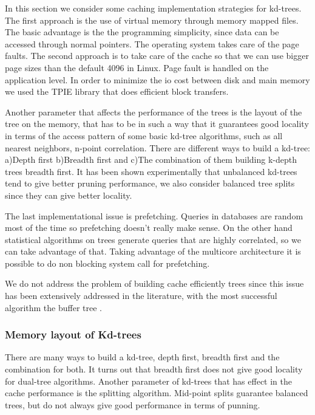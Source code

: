 \documentclass[12pt,letterpaper,doublespaced,ETD,dvips,proposal]{gtthesis}
\begin{document}
\begin{Body}
In this section we consider some caching implementation strategies for
kd-trees. The first approach is the use of virtual memory through
memory mapped files. The basic advantage is the the programming
simplicity, since data can be accessed through normal pointers. The
operating system takes care of the page faults. The second approach
is to take care of the cache so that we can use bigger page sizes
than the default 4096 in Linux. Page fault is handled on the
application level. In order to minimize the io cost between disk and
main memory we used the TPIE library that does efficient block
transfers.

Another parameter that affects the performance of the trees is the
layout of the tree on the memory, that has to be in such a way that
it guarantees good locality in terms of the access pattern of some
basic kd-tree algorithms, such as all  nearest neighbors, n-point
correlation. There are different ways to build a kd-tree: a)Depth
first b)Breadth first and c)The combination of them building k-depth
trees breadth first. It has been shown experimentally that
unbalanced kd-trees tend to give better pruning performance, we also
consider balanced tree splits since they can give better locality.

The last implementational issue is prefetching.  Queries in
databases are random most of the time so prefetching doesn't really
make sense. On the other hand statistical algorithms on trees
generate queries that are highly correlated, so we can take
advantage of that. Taking advantage of the multicore architecture it
is possible to do non blocking system call for prefetching.

We do not address the problem of building cache
efficiently trees since this issue has been extensively addressed in
the literature, with the most successful algorithm the buffer tree 
\cite{arge2003btt}.

\subsubsection{Memory layout of Kd-trees} There are many ways to
build a kd-tree, depth first, breadth first and the combination for
both. It turns out that breadth first does not give good locality
for dual-tree algorithms. Another parameter of
kd-trees that has effect in the cache performance is the splitting
algorithm. Mid-point splits  guarantee balanced trees, but do not
always give good performance in terms of punning.


\end{Body}
\end{document}
